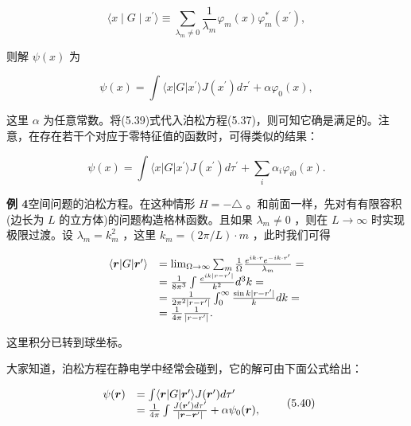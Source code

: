 \begin{equation*}
\langle x \mid G \mid x ^ {\prime} \rangle \equiv \sum_ {\lambda_ {m} \neq 0} \frac {1}{\lambda_ {m}} \varphi_ {m} (x) \varphi_ {m} ^ {*} (x ^ {\prime}),
\end{equation*}

则解 $\psi (x)$ 为

\begin{equation*}
\psi (x) = \int \langle x | G | x ^ {\prime} \rangle J (x ^ {\prime}) d \tau^ {\prime} + \alpha \varphi_ {0} (x),\tag{5.39}
\end{equation*}

这里 $\alpha$ 为任意常数。将(5.39)式代入泊松方程(5.37)，则可知它确是满足的。注意，在存在若干个对应于零特征值的函数时，可得类似的结果：

\begin{equation*}
\psi (x) = \int \langle x | G | x ^ {\prime} \rangle J (x ^ {\prime}) d \tau^ {\prime} + \sum_ {i} \alpha_ {i} \varphi_ {i 0} (x).
\end{equation*}

\textbf{例 4}\quad 空间问题的泊松方程。在这种情形 $H = -\triangle$ 。和前面一样，先对有有限容积(边长为 $L$ 的立方体)的问题构造格林函数。且如果 $\lambda_{m} \neq 0$ ，则在 $L \to \infty$ 时实现极限过渡。设 $\lambda_{m} = k_{m}^{2}$ ，这里 $k_{m} = (2\pi / L) \cdot m$ ，此时我们可得

\begin{equation*}
\begin{array}{r l}\langle \boldsymbol {r} | G | \boldsymbol {r} ^ {\prime} \rangle&= \lim _ {\Omega \rightarrow \infty} \sum_ {m} \frac {1}{\Omega} \frac {e ^ {i k \cdot r} e ^ {- i k \cdot r ^ {\prime}}}{\lambda_ {m}} =\\&= \frac {1}{8 \pi^ {3}} \int \frac {e ^ {i k | r - r ^ {\prime} |}}{k ^ {2}} d ^ {3} k =\\&= \frac {1}{2 \pi^ {2} | r - r ^ {\prime} |} \int_ {0} ^ {\infty} \frac {\sin k | r - r ^ {\prime} |}{k} d k =\\&= \frac {1}{4 \pi} \frac {1}{| r - r ^ {\prime} |}.\end{array}
\end{equation*}

这里积分已转到球坐标。

大家知道，泊松方程在静电学中经常会碰到，它的解可由下面公式给出：

\begin{equation*}
\begin{array}{r l} \psi (\boldsymbol {r}) & = \int \langle \boldsymbol {r} | G | \boldsymbol {r} ^ {\prime} \rangle J (\boldsymbol {r} ^ {\prime}) d \tau^ {\prime} \\ & = \frac {1}{4 \pi} \int \frac {J (\boldsymbol {r} ^ {\prime}) d \tau^ {\prime}}{| \boldsymbol {r} - \boldsymbol {r} ^ {\prime} |} + \alpha \psi_ {0} (\boldsymbol {r}), \end{array}\tag{5.40}
\end{equation*}

